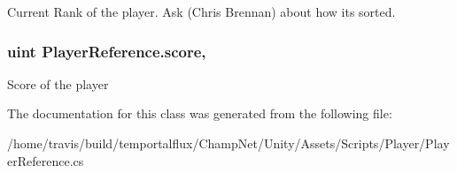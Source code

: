 Current Rank of the player. Ask  (Chris Brennan) about how its sorted. 

\hypertarget{class_player_reference_ae0a1650c4dcd10b54eecdc1eca0edfb9}{
\subsubsection[{score}]{\setlength{\rightskip}{0pt plus 5cm}uint Player\-Reference.\-score\hspace{0.3cm}{\ttfamily [get]}, {\ttfamily [set]}}}\label{class_player_reference_ae0a1650c4dcd10b54eecdc1eca0edfb9}


Score of the player 



The documentation for this class was generated from the following file\-:\begin{DoxyCompactItemize}
\item 
/home/travis/build/temportalflux/\-Champ\-Net/\-Unity/\-Assets/\-Scripts/\-Player/Player\-Reference.\-cs\end{DoxyCompactItemize}
